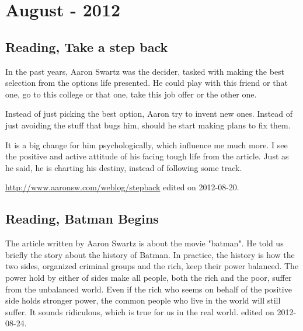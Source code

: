 \chapter{August - 2012} %
\label{ch:aug:2012} %


\section{Reading, Take a step back}
In the past years, Aaron Swartz was the decider, tasked with making the best selection from the options life presented.
He could play with this friend or that one, go to this college or that one, take this job offer or the other one.

Instead of just picking the best option, Aaron try to invent new ones. Instead of just avoiding the stuff that bugs him, should he start making plans to fix them.

It is a big change for him psychologically, which influence me much more. I see the positive and active attitude of his facing tough life from the article. Just as he said, he is charting his destiny, instead of following some track. 


\url{http://www.aaronsw.com/weblog/stepback}
\hfill {\tiny  edited on 2012-08-20.}

\section{Reading, Batman Begins}
The article written by Aaron Swartz is about the movie "batman". He told us briefly the story about the history of Batman. In practice, the history is how the two sides, organized criminal groups and the rich, keep their power balanced. The power hold by either of sides make all people, both the rich and the poor, suffer from the unbalanced world. Even if the rich who seems  on behalf of the positive side holds stronger power, the common people who live in the world will still suffer. It sounds ridiculous, which is true for us in the real world.
\hfill {\tiny  edited on 2012-08-24.}

